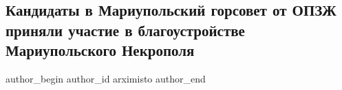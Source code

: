  
 
 
 
 

\subsection{Кандидаты в Мариупольский горсовет от ОПЗЖ приняли участие в благоустройстве Мариупольского Некрополя}
\label{sec:21_09_2020.fb.arximisto.1.kandidaty_mar_gorsovet_opzzh_nekropol}

\ifcmt
 author_begin
   author_id arximisto
 author_end
\fi
